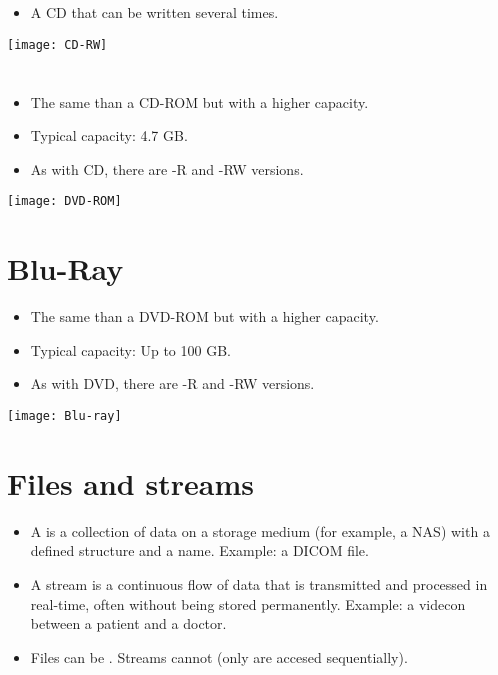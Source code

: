 \section{}
\begin{itemize}
\item A \gls{CD} that can be written several times.
\end{itemize}
\vspace{-4ex}
\begin{center}
  \texttt{[image: CD-RW]}
\end{center}

\section{}
\begin{itemize}
\item The same than a \gls{CD-ROM} but with a higher capacity.
\item Typical capacity: 4.7 GB.
\item As with \gls{CD}, there are -R and -RW versions.
\end{itemize}
\vspace{-4ex}
\begin{center}
  \texttt{[image: DVD-ROM]}
\end{center}

\section{Blu-Ray}
\begin{itemize}
\item The same than a \gls{DVD-ROM} but with a higher capacity.
\item Typical capacity: Up to 100 GB.
\item As with \gls{DVD}, there are -R and -RW versions.
\end{itemize}
\vspace{-4ex}
\begin{center}
  \texttt{[image: Blu-ray]}
\end{center}

\section{Files and streams}
\begin{itemize}
\item A  is a collection of data  on a storage
medium (for example, a NAS) with a defined structure and a
name. Example: a DICOM file.
\item A stream is a continuous flow of data that is transmitted and
processed in real-time, often without being stored
permanently. Example: a videcon between a patient and a doctor.
\item Files can be . Streams cannot (only are accesed
sequentially).
\end{itemize}

